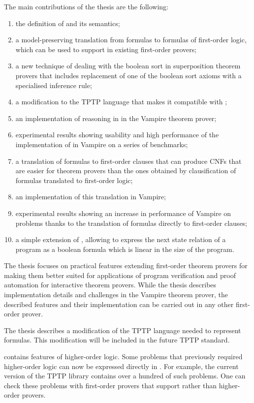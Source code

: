 The main contributions of the thesis are the following:
\begin{enumerate}
  \item the definition of \folb{} and its semantics;
  \item a model-preserving translation from \folb{} formulas to formulas of first-order logic, which can be used to support \folb{} in existing first-order provers;
  \item a new technique of dealing with the boolean sort in superposition theorem provers that includes replacement of one of the boolean sort axioms with a specialised inference rule;
  \item a modification to the TPTP language that makes it compatible with \folb{};
  \item an implementation of reasoning in \folb{} in the Vampire theorem prover;
  \item experimental results showing usability and high performance of the implementation of \folb{} in Vampire on a series of benchmarks;
  \item a translation of \folb{} formulas to first-order clauses that can produce CNFs that are easier for theorem provers than the ones obtained by clausification of \folb{} formulas translated to first-order logic;
  \item an implementation of this translation in Vampire;
  \item experimental results showing an increase in performance of Vampire on \folb{} problems thanks to the translation of \folb{} formulas directly to first-order clauses;
  \item a simple extension of \folb{}, allowing to express the next state relation of a program as a boolean formula which is linear in the size of the program.
\end{enumerate}

The thesis focuses on practical features extending first-order theorem provers for making them better suited for applications of program verification and proof automation for interactive theorem provers. While the thesis describes implementation details and challenges in the Vampire theorem prover, the described features and their implementation can be carried out in any other first-order prover.

The thesis describes a modification of the TPTP language needed to represent \folb{} formulas. This modification will be included in the future TPTP standard.

\folb{} contains features of higher-order logic. Some problems that previously required higher-order logic can now be expressed directly in \folb{}. For example, the current version of the TPTP library contains over a hundred of such problems. One can check these problems with first-order provers that support \folb{} rather than higher-order provers. 


